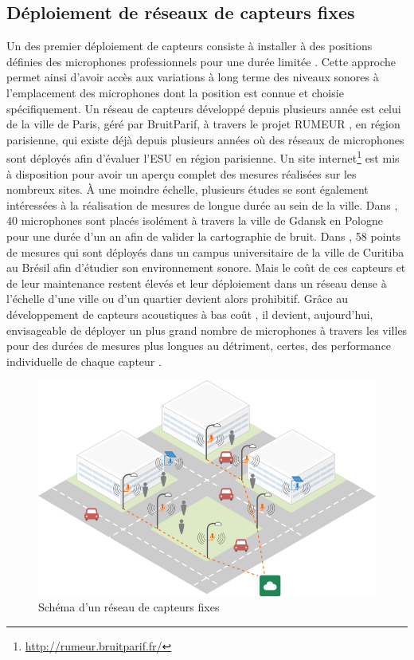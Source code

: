 \subsection{Déploiement de réseaux de capteurs fixes}

Un des premier déploiement de capteurs consiste à installer à des positions définies des microphones professionnels pour une durée limitée . Cette approche permet ainsi d'avoir accès aux variations à long terme des niveaux sonores à l'emplacement des microphones dont la position est connue et choisie spécifiquement. Un réseau de capteurs développé depuis plusieurs année est celui de la ville de Paris, géré par BruitParif, à travers le projet RUMEUR \cite{mietlicki2012innovative}, en région parisienne, qui existe déjà depuis plusieurs années où des réseaux de microphones sont déployés afin d'évaluer l'ESU en région parisienne. Un site internet\footnote{\url{http://rumeur.bruitparif.fr/}} est mis à disposition pour avoir un aperçu complet des mesures réalisées sur les nombreux sites.
À une moindre échelle, plusieurs études se sont également intéressées à la réalisation de mesures de longue durée au sein de la ville.
Dans \cite{Mioduszewski}, 40 microphones sont placés isolément à travers la ville de Gdansk en Pologne pour une durée d'un an afin de valider la cartographie de bruit. Dans \cite{zannin_characterization_2013}, 58 points de mesures qui sont déployés dans un campus universitaire de la ville de Curitiba au Brésil afin d'étudier son environnement sonore. Mais le coût de ces capteurs et de leur maintenance restent élevés et leur déploiement dans un réseau dense à l'échelle d'une ville ou d'un quartier devient alors prohibitif. Grâce au développement de capteurs acoustiques à bas coût \cite{van2010use}, il devient, aujourd'hui, envisageable de déployer un plus grand nombre de microphones à travers les villes pour des durées de mesures plus longues au détriment, certes, des performance individuelle de chaque capteur \cite{aumond2017study}.

\begin{figure}[t]
\centering
\includegraphics[width=0.8\linewidth]{./figures/cartographie/reseau_mesure.png}
\caption{Schéma d'un réseau de capteurs fixes}
\label{fig:reseau_capteur}
\end{figure}

